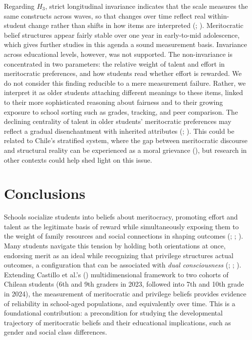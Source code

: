 \documentclass[
  11pt,
]{article}
\begin{document}
Regarding \(H_3\), strict longitudinal invariance indicates that the
scale measures the same constructs across waves, so that changes over
time reflect real within-student change rather than shifts in how items
are interpreted (;
).
Meritocratic belief structures appear fairly stable over one year in
early-to-mid adolescence, which gives further studies in this agenda a
sound measurement basis. Invariance across educational levels, however,
was not supported. The non-invariance is concentrated in two parameters:
the relative weight of talent and effort in meritocratic preferences,
and how students read whether effort is rewarded. We do not consider
this finding reducible to a mere measurement failure. Rather, we
interpret it as older students attaching different meanings to these
items, linked to their more sophisticated reasoning about fairness and
to their growing exposure to school sorting such as grades, tracking,
and peer comparison. The declining centrality of talent in older
students' meritocratic preferences may reflect a gradual disenchantment
with inherited attributes (; ). This could be related to Chile's stratified system, where the
gap between meritocratic discourse and structural reality can be
experienced as a moral grievance
(), but research in other contexts could help shed light on this
issue.

\section{Conclusions}\label{conclusions}

Schools socialize students into beliefs about meritocracy, promoting
effort and talent as the legitimate basis of reward while simultaneously
exposing them to the weight of family resources and social connections
in shaping outcomes (; ;
). Many students
navigate this tension by holding both orientations at once, endorsing
merit as an ideal while recognizing that privilege structures actual
outcomes, a configuration that can be associated with \emph{dual
consciousness} (; ;
). Extending
Castillo et al.'s ()
multidimensional framework to two cohorts of Chilean students (6th and
9th graders in 2023, followed into 7th and 10th grade in 2024), the
measurement of meritocratic and privilege beliefs provides evidence of
reliability in school-aged populations, and equivalently over time. This
is a foundational contribution: a precondition for studying the
developmental trajectory of meritocratic beliefs and their educational
implications, such as gender and social class differences.
\end{document}
